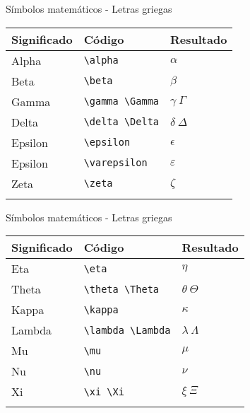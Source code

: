 \documentclass[
  ignorenonframetext,
]{beamer}
\begin{document}
\begin{frame}[fragile]{Símbolos matemáticos - Letras griegas}
\label{suxedmbolos-matemuxe1ticos---letras-griegas}
\begin{longtable}[]{@{}lll@{}}
\toprule\noalign{}
Significado & Código & Resultado \\
\midrule\noalign{}
\endhead
Alpha & \texttt{\textbackslash{}alpha} & \(\alpha\) \\
Beta & \texttt{\textbackslash{}beta} & \(\beta\) \\
Gamma & \texttt{\textbackslash{}gamma\ \textbackslash{}Gamma} &
\(\gamma\  \Gamma\) \\
Delta & \texttt{\textbackslash{}delta\ \textbackslash{}Delta} &
\(\delta\  \Delta\) \\
Epsilon & \texttt{\textbackslash{}epsilon} & \(\epsilon\) \\
Epsilon & \texttt{\textbackslash{}varepsilon} & \(\varepsilon\) \\
Zeta & \texttt{\textbackslash{}zeta} & \(\zeta\) \\
\bottomrule\noalign{}
\end{longtable}
\end{frame}

\begin{frame}[fragile]{Símbolos matemáticos - Letras griegas}
\label{suxedmbolos-matemuxe1ticos---letras-griegas-1}
\begin{longtable}[]{@{}lll@{}}
\toprule\noalign{}
Significado & Código & Resultado \\
\midrule\noalign{}
\endhead
Eta & \texttt{\textbackslash{}eta} & \(\eta\) \\
Theta & \texttt{\textbackslash{}theta\ \textbackslash{}Theta} &
\(\theta\ \Theta\) \\
Kappa & \texttt{\textbackslash{}kappa} & \(\kappa\) \\
Lambda & \texttt{\textbackslash{}lambda\ \textbackslash{}Lambda} &
\(\lambda\  \Lambda\) \\
Mu & \texttt{\textbackslash{}mu} & \(\mu\) \\
Nu & \texttt{\textbackslash{}nu} & \(\nu\) \\
Xi & \texttt{\textbackslash{}xi\ \textbackslash{}Xi} & \(\xi\ \Xi\) \\
\bottomrule\noalign{}
\end{longtable}
\end{frame}
\end{document}
